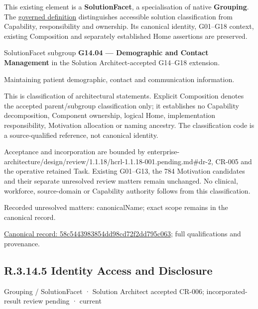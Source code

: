 This existing element is a \textbf{SolutionFacet}, a specialisation of native
\textbf{Grouping}. The \href{\detokenize{../../../../../../../governance/continuum-representation.md#solutionfacet-classification--1119-candidate}}{governed definition}
distinguishes accessible solution classification from Capability, responsibility
and ownership. Its canonical identity, G01–G18 context, existing Composition
and separately established Home assertions are preserved.



SolutionFacet subgroup \textbf{G14.04 — Demographic and Contact Management} in the Solution Architect-accepted G14–G18 extension.



Maintaining patient demographic, contact and communication information.



This is classification of architectural statements. Explicit Composition denotes the accepted parent/subgroup classification only; it establishes no Capability decomposition, Component ownership, logical Home, implementation responsibility, Motivation allocation or naming ancestry. The classification code is a source-qualified reference, not canonical identity.



Acceptance and incorporation are bounded by enterprise-architecture/design/review/1.1.18/hcrl-1.1.18-001.pending.md\#dr-2, CR-005 and the operative retained Task. Existing G01–G13, the 784 Motivation candidates and their separate unresolved review matters remain unchanged. No clinical, workforce, source-domain or Capability authority follows from this classification.


{\small Recorded unresolved matters: canonicalName; exact scope remains in the canonical record.}\par
{\footnotesize \href{../../../../../../../continuum/grouping/58c5443983854dd98cd72f2dd795c063.md}{Canonical record: 58c5443983854dd98cd72f2dd795c063}; full qualifications and provenance.}\par
\subsection*{R.3.14.5 Identity Access and Disclosure}
\label{navigation:R.3.14.5}

\label{element:2f97190ae5734e8caee48d581e1a6ab2}
{\small Grouping / SolutionFacet · Solution Architect accepted CR-006; incorporated-result review pending · current}\par

